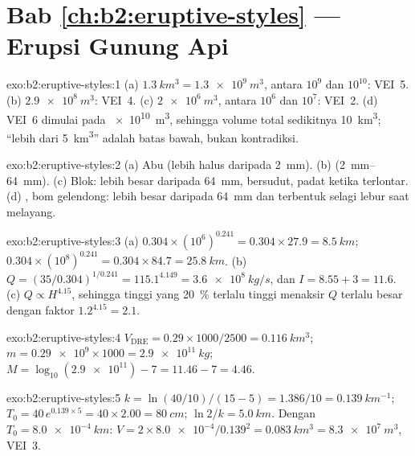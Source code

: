 \section*{Bab \ref{ch:b2:eruptive-styles} --- Erupsi Gunung Api}

\begin{solution}{exo:b2:eruptive-styles:1}
(a) $\qty{1.3}{km^3} = \qty{1.3e9}{m^3}$, antara $10^9$ dan $10^{10}$: VEI~5.
(b) $\qty{2.9e8}{m^3}$: VEI~4. (c) $\qty{2e6}{m^3}$, antara $10^6$ dan $10^7$:
VEI~2. (d) VEI~6 dimulai pada \qty{e10}{m^3}, sehingga volume total  sedikitnya
\qty{10}{km^3}; ``lebih dari \qty{5}{km^3}'' adalah batas bawah, bukan kontradiksi.
\end{solution}

\begin{solution}{exo:b2:eruptive-styles:2}
(a) Abu (lebih halus daripada \qty{2}{mm}). (b)  (\qtyrange{2}{64}{mm}).
(c) Blok: lebih besar daripada \qty{64}{mm}, bersudut, padat ketika terlontar. (d)
, bom gelendong: lebih besar daripada \qty{64}{mm} dan terbentuk selagi lebur
saat melayang.
\end{solution}

\begin{solution}{exo:b2:eruptive-styles:3}
(a) $0.304\times(10^6)^{0.241} = 0.304\times27.9 = \qty{8.5}{km}$;
$0.304\times(10^8)^{0.241} = 0.304\times84.7 = \qty{25.8}{km}$.
(b) $Q = (35/0.304)^{1/0.241} = 115.1^{4.149} = \qty{3.6e8}{kg/s}$, dan $I =
8.55 + 3 = 11.6$. (c) $Q \propto H^{4.15}$, sehingga tinggi yang \qty{20}{\percent} terlalu tinggi
menaksir $Q$ terlalu besar dengan faktor $1.2^{4.15} = 2.1$.
\end{solution}

\begin{solution}{exo:b2:eruptive-styles:4}
$V_{\mathrm{DRE}} = 0.29\times1000/2500 = \qty{0.116}{km^3}$; $m =
\num{0.29e9}\times1000 = \qty{2.9e11}{kg}$; $M = \log_{10}(\num{2.9e11}) - 7 = 11.46
- 7 = 4.46$.
\end{solution}

\begin{solution}{exo:b2:eruptive-styles:5}
$k = \ln(40/10)/(15 - 5) = 1.386/10 = \qty{0.139}{km^{-1}}$; $T_0 = 40\,e^{0.139\times5}
= 40\times2.00 = \qty{80}{cm}$; $\ln2/k = \qty{5.0}{km}$. Dengan $T_0 =
\qty{8.0e-4}{km}$: $V = 2\times\num{8.0e-4}/0.139^2 = \qty{0.083}{km^3} =
\qty{8.3e7}{m^3}$, VEI~3.
\end{solution}

